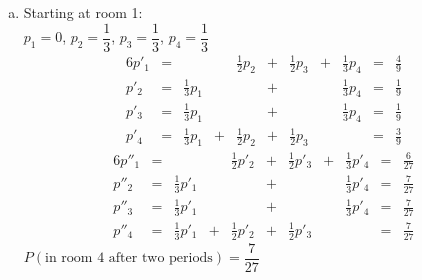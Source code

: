 \documentclass[fleqn]{article}
\begin{document}
\begin{enumerate}[{1}.1]
\begin{itemize}
\begin{enumerate}[(a)]
				\item
				Starting at room 1: \\
				$p_1=0$, $p_2=\dfrac{1}{3}$, $p_3=\dfrac{1}{3}$, $p_4=\dfrac{1}{3}$
				\begin{alignat*}{6}
					p'_1 & {}={} & & & \frac{1}{2}p_2 & {}+{} & \frac{1}{2}p_3 & {}+{} & \frac{1}{3}p_4 & {}={} & \frac{4}{9} \\
					p'_2 & {}={} & \frac{1}{3}p_1 & & & {}+{} & & & \frac{1}{3}p_4 & {}={} & \frac{1}{9} \\
					p'_3 & {}={} & \frac{1}{3}p_1 & & & {}+{} & & & \frac{1}{3}p_4 & {}={} & \frac{1}{9} \\
					p'_4 & {}={} & \frac{1}{3}p_1 & {}+{} & \frac{1}{2}p_2 & {}+{} & \frac{1}{2}p_3  & & & {}={} & \frac{3}{9}
				\end{alignat*}
				\begin{alignat*}{6}
					p''_1 & {}={} & & & \frac{1}{2}p'_2 & {}+{} & \frac{1}{2}p'_3 & {}+{} & \frac{1}{3}p'_4 & {}={} & \frac{6}{27} \\
					p''_2 & {}={} & \frac{1}{3}p'_1 & & & {}+{} & & & \frac{1}{3}p'_4 & {}={} & \frac{7}{27} \\
					p''_3 & {}={} & \frac{1}{3}p'_1 & & & {}+{} & & & \frac{1}{3}p'_4 & {}={} & \frac{7}{27} \\
					p''_4 & {}={} & \frac{1}{3}p'_1 & {}+{} & \frac{1}{2}p'_2 & {}+{} & \frac{1}{2}p'_3  & & & {}={} & \frac{7}{27}
				\end{alignat*}
				$P(\text{in room 4 after two periods})=\dfrac{7}{27}$
			\end{enumerate}
		\end{itemize}
	\end{enumerate}
\end{document}

